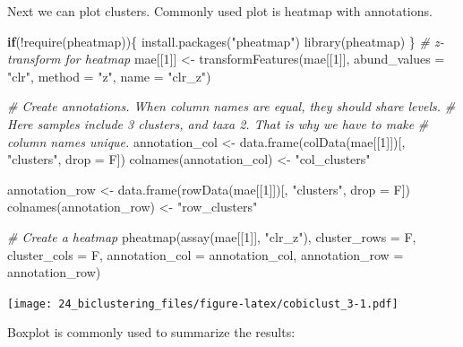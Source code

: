 \documentclass[
]{book}
\newenvironment{Shaded}{\begin{snugshade}}{\end{snugshade}}
\newcommand{\AttributeTok}[1]{\textcolor[rgb]{0.77,0.63,0.00}{#1}}
\newcommand{\CommentTok}[1]{\textcolor[rgb]{0.56,0.35,0.01}{\textit{#1}}}
\newcommand{\ControlFlowTok}[1]{\textcolor[rgb]{0.13,0.29,0.53}{\textbf{#1}}}
\newcommand{\DecValTok}[1]{\textcolor[rgb]{0.00,0.00,0.81}{#1}}
\newcommand{\FunctionTok}[1]{\textcolor[rgb]{0.00,0.00,0.00}{#1}}
\newcommand{\NormalTok}[1]{#1}
\newcommand{\OtherTok}[1]{\textcolor[rgb]{0.56,0.35,0.01}{#1}}
\newcommand{\SpecialCharTok}[1]{\textcolor[rgb]{0.00,0.00,0.00}{#1}}
\newcommand{\StringTok}[1]{\textcolor[rgb]{0.31,0.60,0.02}{#1}}
\begin{document}
Next we can plot clusters. Commonly used plot is heatmap with annotations.

\begin{Shaded}
\begin{Highlighting}[]
\ControlFlowTok{if}\NormalTok{(}\SpecialCharTok{!}\FunctionTok{require}\NormalTok{(pheatmap))\{}
    \FunctionTok{install.packages}\NormalTok{(}\StringTok{"pheatmap"}\NormalTok{)}
    \FunctionTok{library}\NormalTok{(pheatmap)}
\NormalTok{\}}
\CommentTok{\# z{-}transform for heatmap}
\NormalTok{mae[[}\DecValTok{1}\NormalTok{]] }\OtherTok{\textless{}{-}} \FunctionTok{transformFeatures}\NormalTok{(mae[[}\DecValTok{1}\NormalTok{]], }\AttributeTok{abund\_values =} \StringTok{"clr"}\NormalTok{, }\AttributeTok{method =} \StringTok{"z"}\NormalTok{, }\AttributeTok{name =} \StringTok{"clr\_z"}\NormalTok{)}

\CommentTok{\# Create annotations. When column names are equal, they should share levels. }
\CommentTok{\# Here samples include 3 clusters, and taxa 2. That is why we have to make }
\CommentTok{\# column names unique. }
\NormalTok{annotation\_col }\OtherTok{\textless{}{-}} \FunctionTok{data.frame}\NormalTok{(}\FunctionTok{colData}\NormalTok{(mae[[}\DecValTok{1}\NormalTok{]])[, }\StringTok{"clusters"}\NormalTok{, }\AttributeTok{drop =}\NormalTok{ F])}
\FunctionTok{colnames}\NormalTok{(annotation\_col) }\OtherTok{\textless{}{-}} \StringTok{"col\_clusters"}

\NormalTok{annotation\_row }\OtherTok{\textless{}{-}} \FunctionTok{data.frame}\NormalTok{(}\FunctionTok{rowData}\NormalTok{(mae[[}\DecValTok{1}\NormalTok{]])[, }\StringTok{"clusters"}\NormalTok{, }\AttributeTok{drop =}\NormalTok{ F])}
\FunctionTok{colnames}\NormalTok{(annotation\_row) }\OtherTok{\textless{}{-}} \StringTok{"row\_clusters"}

\CommentTok{\# Create a heatmap}
\FunctionTok{pheatmap}\NormalTok{(}\FunctionTok{assay}\NormalTok{(mae[[}\DecValTok{1}\NormalTok{]], }\StringTok{"clr\_z"}\NormalTok{), }\AttributeTok{cluster\_rows =}\NormalTok{ F, }\AttributeTok{cluster\_cols =}\NormalTok{ F, }
         \AttributeTok{annotation\_col =}\NormalTok{ annotation\_col,}
         \AttributeTok{annotation\_row =}\NormalTok{ annotation\_row)}
\end{Highlighting}
\end{Shaded}

\texttt{[image: 24\_biclustering\_files/figure-latex/cobiclust\_3-1.pdf]}

Boxplot is commonly used to summarize the results:
\end{document}
